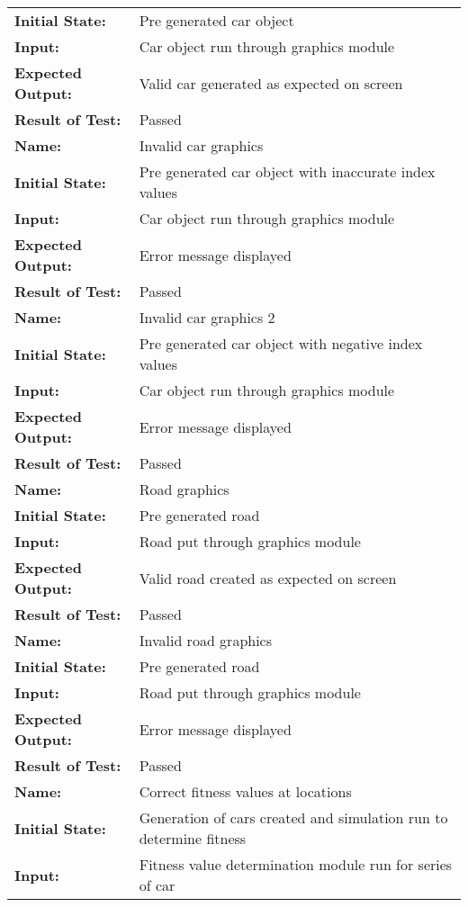 \documentclass[12pt, titlepage]{article}
\begin{document}
\begin{center}
\begin{longtable}{ l | p{10cm} }
\textbf{Initial State:} & Pre generated car object\\
\textbf{Input:} & Car object run through graphics module\\
\textbf{Expected Output:} & Valid car generated as expected on screen\\[0.6em]
\textbf{Result of Test:} & Passed\\
\hline
\rule{0pt}{1.5em}\textbf{Name:} & Invalid car graphics\\
\textbf{Initial State:} & Pre generated car object with inaccurate index 
values\\
\textbf{Input:} & Car object run through graphics module\\
\textbf{Expected Output:} & Error message displayed\\[0.6em]
\textbf{Result of Test:} & Passed\\
\hline
\rule{0pt}{1.5em}\textbf{Name:} & Invalid car graphics 2\\
\textbf{Initial State:} & Pre generated car object with negative index values\\
\textbf{Input:} & Car object run through graphics module\\
\textbf{Expected Output:} & Error message displayed\\[0.6em]
\textbf{Result of Test:} & Passed\\
\hline
\rule{0pt}{1.5em}\textbf{Name:} & Road graphics\\
\textbf{Initial State:} & Pre generated road\\
\textbf{Input:} & Road put through graphics module\\
\textbf{Expected Output:} & Valid road created as expected on screen\\[0.6em]
\textbf{Result of Test:} & Passed\\
\hline
\rule{0pt}{1.5em}\textbf{Name:} & Invalid road graphics\\
\textbf{Initial State:} & Pre generated road\\
\textbf{Input:} & Road put through graphics module\\
\textbf{Expected Output:} & Error message displayed\\[0.6em]
\textbf{Result of Test:} & Passed\\
\hline
\rule{0pt}{1.5em}\textbf{Name:} & Correct fitness values at locations\\
\textbf{Initial State:} & Generation of cars created and simulation run to 
determine fitness\\
\textbf{Input:} & Fitness value determination module run for series of car 

\end{longtable}
\end{center}
\end{document}
